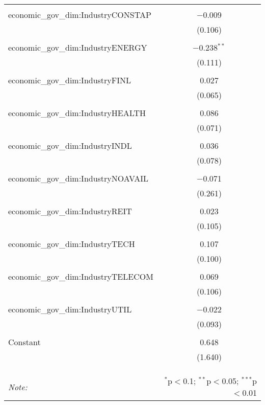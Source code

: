\begin{table}[!htbp]
\begin{tabular}{@{\extracolsep{5pt}}lc}
  & \\ 
 economic\_gov\_dim:IndustryCONSTAP & $-$0.009 \\ 
  & (0.106) \\ 
  & \\ 
 economic\_gov\_dim:IndustryENERGY & $-$0.238$^{**}$ \\ 
  & (0.111) \\ 
  & \\ 
 economic\_gov\_dim:IndustryFINL & 0.027 \\ 
  & (0.065) \\ 
  & \\ 
 economic\_gov\_dim:IndustryHEALTH & 0.086 \\ 
  & (0.071) \\ 
  & \\ 
 economic\_gov\_dim:IndustryINDL & 0.036 \\ 
  & (0.078) \\ 
  & \\ 
 economic\_gov\_dim:IndustryNOAVAIL & $-$0.071 \\ 
  & (0.261) \\ 
  & \\ 
 economic\_gov\_dim:IndustryREIT & 0.023 \\ 
  & (0.105) \\ 
  & \\ 
 economic\_gov\_dim:IndustryTECH & 0.107 \\ 
  & (0.100) \\ 
  & \\ 
 economic\_gov\_dim:IndustryTELECOM & 0.069 \\ 
  & (0.106) \\ 
  & \\ 
 economic\_gov\_dim:IndustryUTIL & $-$0.022 \\ 
  & (0.093) \\ 
  & \\ 
 Constant & 0.648 \\ 
  & (1.640) \\ 
  & \\ 
\hline \\[-1.8ex] 
\hline 
\hline \\[-1.8ex] 
\textit{Note:}  & \multicolumn{1}{r}{$^{*}$p$<$0.1; $^{**}$p$<$0.05; $^{***}$p$<$0.01} \\ 
\end{tabular} 
\end{table} 
